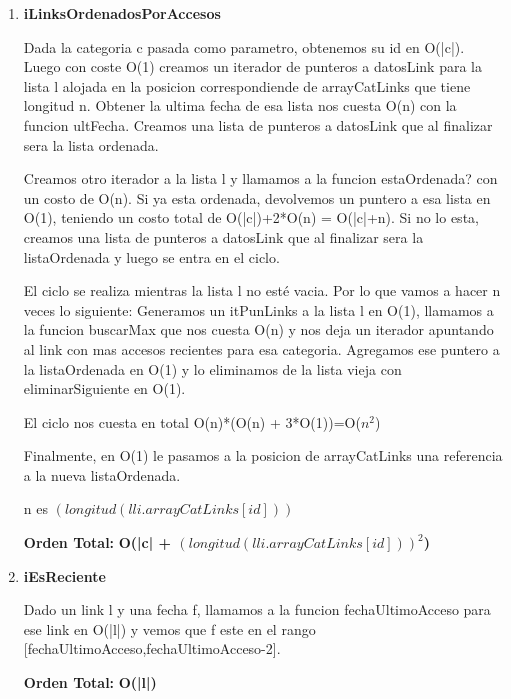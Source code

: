 \begin{enumerate}
\item\textbf{iLinksOrdenadosPorAccesos}
\par Dada la categoria c pasada como parametro, obtenemos su id en O(|c|). Luego con coste O(1) creamos un iterador de punteros a datosLink para la lista l alojada en la posicion correspondiende de arrayCatLinks que tiene longitud n. Obtener la ultima fecha de esa lista nos cuesta O(n) con la funcion ultFecha. Creamos una lista de punteros a datosLink que al finalizar sera la lista ordenada.
\par Creamos otro iterador a la lista l y llamamos a la funcion estaOrdenada? con un costo de O(n). Si ya esta ordenada, devolvemos un puntero a esa lista en O(1), teniendo un costo total de O(|c|)+2*O(n) = O(|c|+n). Si no lo esta, creamos una lista de punteros a datosLink que al finalizar sera la listaOrdenada y luego se entra en el ciclo.
\par El ciclo se realiza mientras la lista l no esté vacia. Por lo que vamos a hacer n veces lo siguiente: Generamos un itPunLinks a la lista l en O(1), llamamos a la funcion buscarMax que nos cuesta O(n) y nos deja un iterador apuntando al link con mas accesos recientes para esa categoria. Agregamos ese puntero a la listaOrdenada en O(1) y lo eliminamos de la lista vieja con eliminarSiguiente en O(1).
\par El ciclo nos cuesta en total O(n)*(O(n) + 3*O(1))=O($n^2$)
\par Finalmente, en O(1) le pasamos a la posicion de arrayCatLinks una referencia a la nueva listaOrdenada.
\par n es $(longitud(lli.arrayCatLinks[id]))$
\par\textbf{Orden Total:} \textbf{O(|c| + $(longitud(lli.arrayCatLinks[id]))^2$)}

\item\textbf{iEsReciente}
\par Dado un link l y una fecha f, llamamos a la funcion fechaUltimoAcceso para ese link en O(|l|) y vemos que f este en el rango [fechaUltimoAcceso,fechaUltimoAcceso-2].
\par\textbf{Orden Total:} \textbf{O(|l|)}

\end{enumerate}



